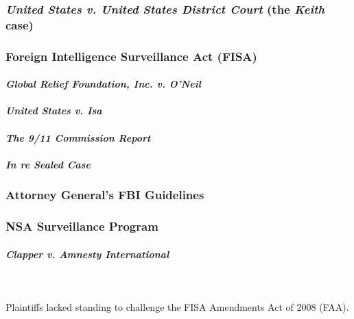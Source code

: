 \subsubsection{\emph{United States v. United States District Court} (the 
\emph{Keith} case)}


\subsubsection{Foreign Intelligence Surveillance Act (FISA)}

\paragraph{\emph{Global Relief Foundation, Inc. v. O'Neil}}


\paragraph{\emph{United States v. Isa}}


\paragraph{\emph{The 9/11 Commission Report}}


\paragraph{\emph{In re Sealed Case}}


\subsubsection{Attorney General's FBI Guidelines}


\newpage %

\subsubsection{NSA Surveillance Program}


\paragraph{\emph{Clapper v. Amnesty International}}
~\\\\
Plaintiffs lacked standing to challenge the FISA Amendments Act of 2008 (FAA).

